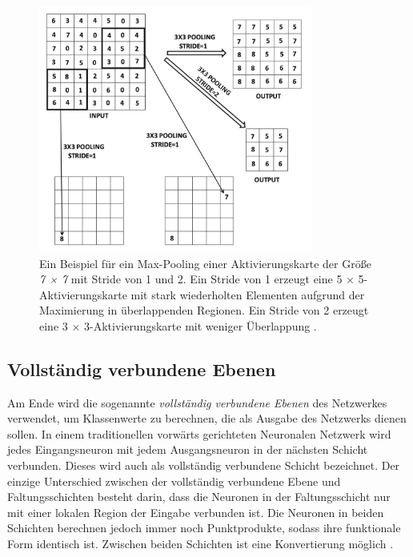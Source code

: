 \begin{figure}[H]
    \centering
    \includegraphics[width=9cm]{kapitel2/maxpooling.png}
    \caption[Max-Pooling]{Ein Beispiel für ein Max-Pooling einer Aktivierungskarte der Größe \textit{7 × 7} mit Stride von 1 und 2. Ein Stride von 1 erzeugt eine 5 × 5-Aktivierungskarte mit stark wiederholten Elementen aufgrund der Maximierung in überlappenden Regionen. Ein Stride von 2 erzeugt eine 3 × 3-Aktivierungskarte mit weniger Überlappung \cite*[326]{Aggarwal2018}.}
    \label{Kap2:Pooling}
\end{figure}


\subsection{Vollständig verbundene Ebenen}
Am Ende wird die sogenannte \textit{vollständig verbundene Ebenen} des Netzwerkes verwendet, um Klassenwerte zu berechnen, die als Ausgabe des Netzwerks dienen sollen. In einem traditionellen vorwärts gerichteten Neuronalen Netzwerk wird jedes Eingangsneuron mit jedem Ausgangsneuron in der nächsten Schicht verbunden. Dieses wird auch als vollständig verbundene Schicht bezeichnet. Der einzige Unterschied zwischen der vollständig verbundene Ebene und Faltungsschichten besteht darin, dass die Neuronen in der Faltungsschicht nur mit einer lokalen Region der Eingabe verbunden ist. Die Neuronen in beiden Schichten berechnen jedoch immer noch Punktprodukte, sodass ihre funktionale Form identisch ist. Zwischen beiden Schichten ist eine Konvertierung möglich \cite*{StanfordUniversityCoursecs231n2018a}.


